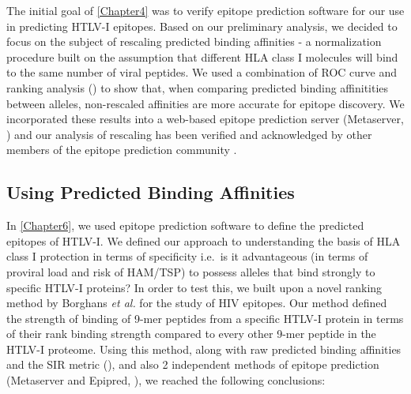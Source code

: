 The initial goal of \cref{Chapter4} was to verify epitope prediction software for our use in predicting HTLV-I epitopes. Based on our preliminary analysis, we decided to focus on the subject of rescaling predicted binding affinities - a normalization procedure built on the assumption that different HLA class I molecules will bind to the same number of viral peptides. We used a combination of ROC curve and ranking analysis () to show that, when comparing predicted binding affinitities between alleles, non-rescaled affinities are more accurate for epitope discovery. We incorporated these results into a web-based epitope prediction server (Metaserver, ) and our analysis of rescaling has been verified and acknowledged by other members of the epitope prediction community \citep{Stranzl2010}.

\subsection{Using Predicted Binding Affinities}

In \cref{Chapter6}, we used epitope prediction software to define the predicted epitopes of HTLV-I. We defined our approach to understanding the basis of HLA class I protection in terms of specificity i.e.~is it advantageous (in terms of proviral load and risk of HAM/TSP) to possess alleles that bind strongly to specific HTLV-I proteins? In order to test this, we built upon a novel ranking method by Borghans \emph{et al.} \citep{borghans2007} for the study of HIV epitopes. Our method defined the strength of binding of 9-mer peptides from a specific HTLV-I protein in terms of their rank binding strength compared to every other 9-mer peptide in the HTLV-I proteome. Using this method, along with raw predicted binding affinities and the SIR metric (), and also 2 independent methods of epitope prediction (Metaserver and Epipred, ), we reached the following conclusions:

